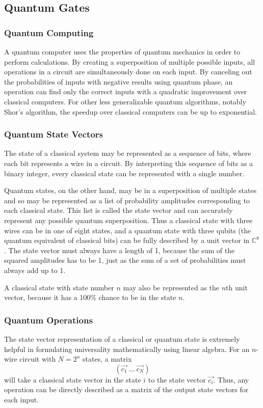 \documentclass[12pt]{article}
\begin{document}
\subsection{Quantum Gates}
\subsubsection{Quantum Computing}
A quantum computer uses the properties of quantum mechanics in order to perform calculations. By creating a superposition of multiple possible inputs, all operations in a circuit are simultaneously done on each input. By canceling out the probabilities of inputs with negative results using quantum phase, an operation can find only the correct inputs with a quadratic improvement over classical computers. For other less generalizable quantum algorithms, notably Shor's algorithm, the speedup over classical computers can be up to exponential.

\subsubsection{Quantum State Vectors}
The state of a classical system may be represented as a sequence of bits, where each bit represents a wire in a circuit. By interpreting this sequence of bits as a binary integer, every classical state can be represented with a single number.

Quantum states, on the other hand, may be in a superposition of multiple states and so may be represented as a list of probability amplitudes corresponding to each classical state. This list is called the state vector and can accurately represent any possible quantum superposition. Thus a classical state with three wires can be in one of eight states, and a quantum state with three qubits (the quantum equivalent of classical bits) can be fully described by a unit vector in $\mathbb{C}^8$. The state vector must always have a length of 1, because the sum of the squared amplitudes has to be 1, just as the sum of a set of probabilities must always add up to 1.

A classical state with state number $n$ may also be represented as the $n$th unit vector, because it has a 100\% chance to be in the state $n$.

\subsubsection{Quantum Operations}
The state vector representation of a classical or quantum state is extremely helpful in formulating universality mathematically using linear algebra. For an $n$-wire circuit with $N=2^n$ states, a matrix
$$
(\vec{c_{1}} \: \dots \: \vec{c_{N}})
$$
will take a classical state vector in the state $i$ to the state vector $\vec{c_{i}}$. Thus, any operation can be directly described as a matrix of the output state vectors for each input.
\end{document}
